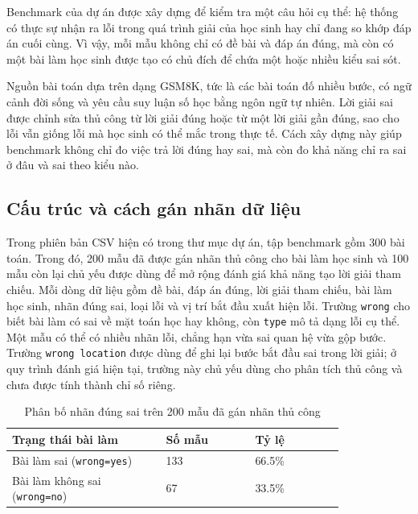\documentclass[12pt,a4paper]{article}
\begin{document}
Benchmark của dự án được xây dựng để kiểm tra một câu hỏi cụ thể: hệ thống có
thực sự nhận ra lỗi trong quá trình giải của học sinh hay chỉ đang so khớp đáp
án cuối cùng. Vì vậy, mỗi mẫu không chỉ có đề bài và đáp án đúng, mà còn có một
bài làm học sinh được tạo có chủ đích để chứa một hoặc nhiều kiểu sai sót.

Nguồn bài toán dựa trên dạng GSM8K, tức là các bài toán đố nhiều bước, có ngữ
cảnh đời sống và yêu cầu suy luận số học bằng ngôn ngữ tự nhiên. Lời giải sai
được chỉnh sửa thủ công từ lời giải đúng hoặc từ một lời giải gần đúng, sao cho
lỗi vẫn giống lỗi mà học sinh có thể mắc trong thực tế. Cách xây dựng này giúp
benchmark không chỉ đo việc trả lời đúng hay sai, mà còn đo khả năng chỉ ra sai
ở đâu và sai theo kiểu nào.

\subsection{Cấu trúc và cách gán nhãn dữ liệu}

Trong phiên bản CSV hiện có trong thư mục dự án, tập benchmark gồm 300 bài toán.
Trong đó, 200 mẫu đã được gán nhãn thủ công cho bài làm học sinh và 100 mẫu còn
lại chủ yếu được dùng để mở rộng đánh giá khả năng tạo lời giải tham chiếu. Mỗi
dòng dữ liệu gồm đề bài, đáp án đúng, lời giải tham chiếu, bài làm học sinh, nhãn
đúng sai, loại lỗi và vị trí bắt đầu xuất hiện lỗi. Trường \texttt{wrong} cho
biết bài làm có sai về mặt toán học hay không, còn \texttt{type} mô tả dạng lỗi
cụ thể. Một mẫu có thể có nhiều nhãn lỗi, chẳng hạn vừa sai quan hệ vừa gộp
bước. Trường \texttt{wrong location} được dùng để ghi lại bước bắt đầu sai trong
lời giải; ở quy trình đánh giá hiện tại, trường này chủ yếu dùng cho phân tích
thủ công và chưa được tính thành chỉ số riêng.

\begin{table}[H]
    \centering
    \begin{tabular}{p{0.38\linewidth} p{0.22\linewidth} p{0.22\linewidth}}
        \toprule
        \textbf{Trạng thái bài làm} & \textbf{Số mẫu} & \textbf{Tỷ lệ} \\
        \midrule
        Bài làm sai (\texttt{wrong=yes}) & 133 & 66.5\% \\
        Bài làm không sai (\texttt{wrong=no}) & 67 & 33.5\% \\
        \bottomrule
    \end{tabular}
    \caption{Phân bố nhãn đúng sai trên 200 mẫu đã gán nhãn thủ công}
\end{table}
\end{document}

